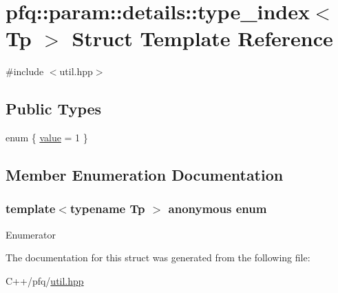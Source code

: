 \hypertarget{structpfq_1_1param_1_1details_1_1type__index_3_01Tp_01_4}{\section{pfq\+:\+:param\+:\+:details\+:\+:type\+\_\+index$<$ Tp $>$ Struct Template Reference}
\label{structpfq_1_1param_1_1details_1_1type__index_3_01Tp_01_4}
}


{\ttfamily \#include $<$util.\+hpp$>$}

\subsection*{Public Types}
\begin{DoxyCompactItemize}
\item 
enum \{ \hyperlink{structpfq_1_1param_1_1details_1_1type__index_3_01Tp_01_4_af9d771ebd1b38996ae3631c8330e6bdda74fe01056516d2934b6ce777009cffe4}{value} = 1
 \}
\end{DoxyCompactItemize}


\subsection{Member Enumeration Documentation}
\hypertarget{structpfq_1_1param_1_1details_1_1type__index_3_01Tp_01_4_af9d771ebd1b38996ae3631c8330e6bdd}{\subsubsection[{anonymous enum}]{\setlength{\rightskip}{0pt plus 5cm}template$<$typename Tp $>$ anonymous enum}}\label{structpfq_1_1param_1_1details_1_1type__index_3_01Tp_01_4_af9d771ebd1b38996ae3631c8330e6bdd}
\begin{Desc}
\item[Enumerator]\par
\begin{description}
\item[{\em 
\hypertarget{structpfq_1_1param_1_1details_1_1type__index_3_01Tp_01_4_af9d771ebd1b38996ae3631c8330e6bdda74fe01056516d2934b6ce777009cffe4}{value}\label{structpfq_1_1param_1_1details_1_1type__index_3_01Tp_01_4_af9d771ebd1b38996ae3631c8330e6bdda74fe01056516d2934b6ce777009cffe4}
}]\end{description}
\end{Desc}


The documentation for this struct was generated from the following file\+:\begin{DoxyCompactItemize}
\item 
C++/pfq/\hyperlink{util_8hpp}{util.\+hpp}\end{DoxyCompactItemize}
